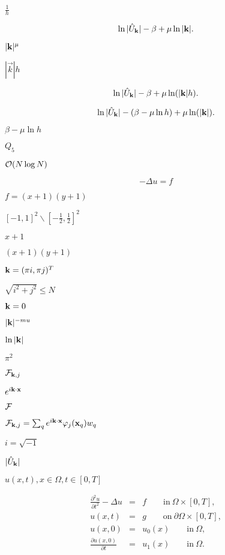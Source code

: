 \documentclass{article}
\begin{document}
$\frac 1h$
\pagebreak

\[ \ln |\hat U_{{\bf k}}| - \beta + \mu \ln |{\bf k}|. \]
\pagebreak

$|{\bf k}|^\mu$
\pagebreak

$|\vec k|h$
\pagebreak

\[ \ln |\hat U_{{\bf k}}| - \beta + \mu \ln (|{\bf k}|h). \]
\pagebreak

\[ \ln |\hat U_{{\bf k}}| - (\beta - \mu \ln h) + \mu \ln (|{\bf k}|). \]
\pagebreak

$\beta-\mu \ln h$
\pagebreak

$Q_5$
\pagebreak

${\cal O}(N \log N)$
\pagebreak

\[ -\Delta u = f \]
\pagebreak

$f=(x+1)(y+1)$
\pagebreak

$[-1,1]^2\backslash[-\frac 12,\frac 12]^2$
\pagebreak

$x+1$
\pagebreak

$(x+1)(y+1)$
\pagebreak

${\bf k}=(\pi i, \pi j)^T$
\pagebreak

$\sqrt{i^2+j^2}\le N$
\pagebreak

${\bf k}=0$
\pagebreak

$|{\bf k}|^{-mu}$
\pagebreak

$\ln |{\bf k}|$
\pagebreak

$\pi^2$
\pagebreak

${\cal F}_{{\bf k},j}$
\pagebreak

$e^{i{\bf k}\cdot{\bf x}}$
\pagebreak

${\cal F}$
\pagebreak

${\cal F}_{{\bf k},j}=\sum_q e^{i{\bf k}\cdot {\bf x}}\varphi_j({\bf x}_q) w_q$
\pagebreak

$i=\sqrt{-1}$
\pagebreak

$|\hat U_{{\bf k}}|$
\pagebreak

$u(x,t), x\in\Omega, t\in[0,T]$
\pagebreak

\begin{eqnarray*} \frac{\partial^2 u}{\partial t^2} - \Delta u &=& f \qquad \textrm{in}\ \Omega\times [0,T], \\ u(x,t) &=& g \qquad \textrm{on}\ \partial\Omega\times [0,T], \\ u(x,0) &=& u_0(x) \qquad \textrm{in}\ \Omega, \\ \frac{\partial u(x,0)}{\partial t} &=& u_1(x) \qquad \textrm{in}\ \Omega. \end{eqnarray*}
\pagebreak
\end{document}
